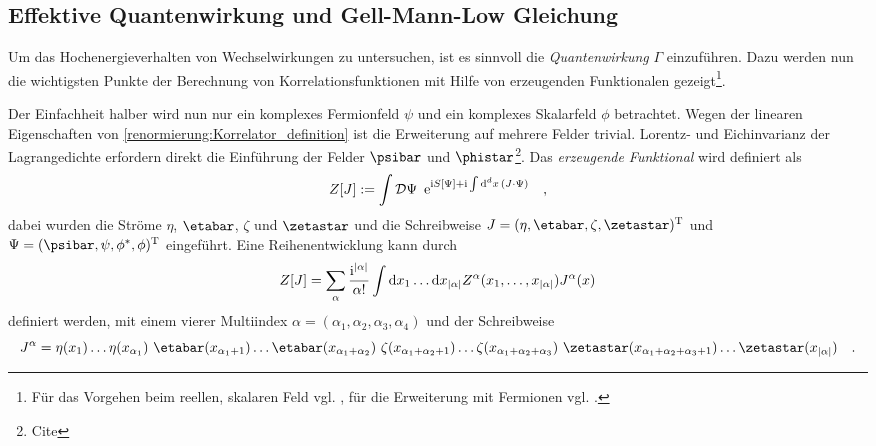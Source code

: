     
    

    
    
  \subsection{Effektive Quantenwirkung und Gell-Mann-Low Gleichung}
    Um das Hochenergieverhalten von Wechselwirkungen zu untersuchen, ist 
    es sinnvoll die \textit{Quantenwirkung} $\Gamma$ einzuführen. Dazu werden 
    nun die wichtigsten Punkte der Berechnung von Korrelationsfunktionen mit 
    Hilfe von erzeugenden Funktionalen gezeigt\footnote{Für das Vorgehen beim 
    reellen, skalaren Feld vgl. \cite{Zinn}, für die Erweiterung mit Fermionen 
    vgl. \cite{Schwartz}.}.
    
    Der Einfachheit halber wird nun nur ein komplexes Fermionfeld $\psi$ und ein 
    komplexes Skalarfeld $\phi$ betrachtet. Wegen der linearen Eigenschaften von 
    \eqref{renormierung:Korrelator_definition} ist die Erweiterung auf mehrere 
    Felder trivial. Lorentz- und Eichinvarianz der Lagrangedichte erfordern 
    direkt die Einführung der Felder $\psibar$ und $\phistar$\footnote{Cite}. 
    Das \textit{erzeugende Funktional} wird definiert als 
    \begin{equation}
    Z[J] := \int \mathcal{D}\Psi \,\,\, 
    \text{e}^{\text{i} S[\Psi]+ 
    \text{i} 
    \int \text{d}^d x \, \left(J \cdot \Psi \right)}
    \quad ,
    \label{renormierung:erzeugendes_Funktional_definition} 
    \end{equation}
    dabei wurden die Ströme $\eta$, $\etabar$, $\zeta$ und $\zetastar$ und die 
    Schreibweise $J=(\eta,\etabar,\zeta,\zetastar)^\text{T}$ und 
    $\Psi=(\psibar,\psi,\phi^*,\phi)^\text{T}$
    eingeführt. Eine Reihenentwicklung kann durch
    \begin{equation}
     Z[J] = \sum\limits_\alpha \frac{ \text{i}^{|\alpha|}}{\alpha!}  
     \int \text{d} x_1 \ldots \text{d} x_{|\alpha|} Z^{\alpha}(x_1,\ldots,x_{|\alpha|} )
     J^\alpha (x) \label{renormierung:Reihenentwicklung}
    \end{equation}
    definiert werden, mit einem vierer 
    Multiindex $\alpha=(\alpha_1,\alpha_2
    ,\alpha_3,\alpha_4)$ und der Schreibweise 
    \begin{equation}
      J^\alpha=
      \eta	(x_1)		\ldots \eta(x_{\alpha_1}) 	\,\,
      \etabar(x_{\alpha_1 +1})	\ldots \etabar(x_{\alpha_1+\alpha_2})	\,\,
      \zeta(x_{\alpha_1+\alpha_2 +1})	\ldots 
      \zeta(x_{\alpha_1+\alpha_2+\alpha_3})	\,\,
      \zetastar(x_{\alpha_1+\alpha_2+\alpha_3 +1})	\ldots 
      \zetastar(x_{|\alpha|})   \quad .
      \label{renormierung:Strom}
    \end{equation}
